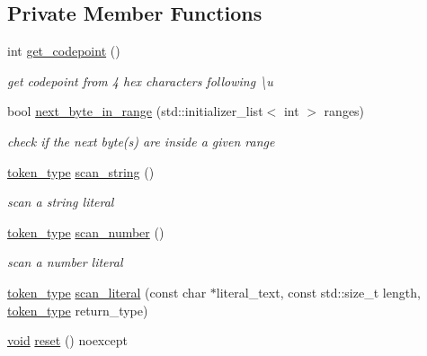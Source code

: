 \subsection*{Private Member Functions}
\begin{DoxyCompactItemize}
\item 
int \mbox{\hyperlink{classnlohmann_1_1detail_1_1lexer_a820b20e25ff255c3c791c37f2bf48380}{get\+\_\+codepoint}} ()
\begin{DoxyCompactList}\small\item\em get codepoint from 4 hex characters following {\ttfamily \textbackslash{}u} \end{DoxyCompactList}\item 
bool \mbox{\hyperlink{classnlohmann_1_1detail_1_1lexer_a2faa544ab5475523ead81f9cdef41a0a}{next\+\_\+byte\+\_\+in\+\_\+range}} (std\+::initializer\+\_\+list$<$ int $>$ ranges)
\begin{DoxyCompactList}\small\item\em check if the next byte(s) are inside a given range \end{DoxyCompactList}\item 
\mbox{\hyperlink{classnlohmann_1_1detail_1_1lexer_a3f313cdbe187cababfc5e06f0b69b098}{token\+\_\+type}} \mbox{\hyperlink{classnlohmann_1_1detail_1_1lexer_ad271045d1c91df9d6a119482b4aeae7f}{scan\+\_\+string}} ()
\begin{DoxyCompactList}\small\item\em scan a string literal \end{DoxyCompactList}\item 
\mbox{\hyperlink{classnlohmann_1_1detail_1_1lexer_a3f313cdbe187cababfc5e06f0b69b098}{token\+\_\+type}} \mbox{\hyperlink{classnlohmann_1_1detail_1_1lexer_a6bd7e6cdb0380a9df663f1c7f115f34f}{scan\+\_\+number}} ()
\begin{DoxyCompactList}\small\item\em scan a number literal \end{DoxyCompactList}\item 
\mbox{\hyperlink{classnlohmann_1_1detail_1_1lexer_a3f313cdbe187cababfc5e06f0b69b098}{token\+\_\+type}} \mbox{\hyperlink{classnlohmann_1_1detail_1_1lexer_a6f717deb553337736f27cdacccaee536}{scan\+\_\+literal}} (const char $\ast$literal\+\_\+text, const std\+::size\+\_\+t length, \mbox{\hyperlink{classnlohmann_1_1detail_1_1lexer_a3f313cdbe187cababfc5e06f0b69b098}{token\+\_\+type}} return\+\_\+type)
\item 
\mbox{\hyperlink{namespacenlohmann_1_1detail_a59fca69799f6b9e366710cb9043aa77d}{void}} \mbox{\hyperlink{classnlohmann_1_1detail_1_1lexer_acba34bc18af19f93186e682d02c3942d}{reset}} () noexcept

\end{DoxyCompactItemize}
